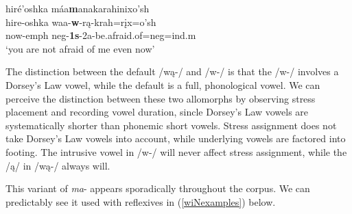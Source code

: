 \begin{exe}
\begin{xlist}
	\item \glll hiré'oshka máa\textbf{m}anakarahinixo'sh\\
	hire-oshka waa-\textbf{w}-rą-krah=rįx=o'sh\\
	\textnormal{now}-emph neg-\textbf{1s}-2a-\textnormal{be.afraid.of}=neg=ind.m\\
	\glt `you are not afraid of me even now' \citep[96]{hollow1973b}
	
	\end{xlist}

\end{exe}

The distinction between the default /wą-/ and /w-/ is that the /w-/ involves a Dorsey's Law vowel, while the default is a full, phonological vowel. We can perceive the distinction between these two allomorphs by observing stress placement and recording vowel duration, sincle Dorsey's Law vowels are systematically shorter than phonemic short vowels. Stress assignment does not take Dorsey's Law vowels into account, while underlying vowels are factored into footing. The intrusive vowel in /w-/ will never affect stress assignment, while the /ą/ in /wą-/ always will.

\label{wiPprefix}

This variant of \textit{ma}- appears sporadically throughout the corpus. We can predictably see it used with reflexives in (\ref{wiNexamples}) below.

